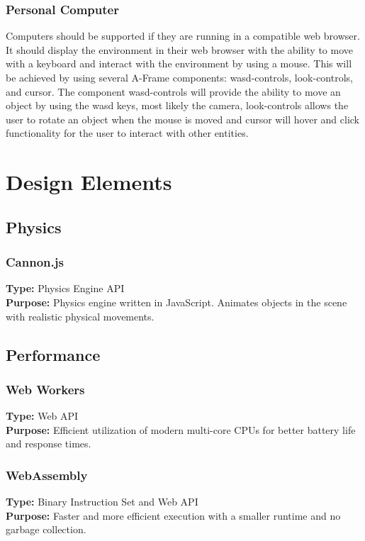 \documentclass[onecolumn, draftclsnofoot,10pt, compsoc]{IEEEtran}
\begin{document}
\subsubsection{Personal Computer}
Computers should be supported if they are running in a compatible web browser. It should display the environment in their web browser with the ability to move with a keyboard and interact with the environment by using a mouse. This will be achieved by using several A-Frame components: wasd-controls, look-controls, and cursor. The component wasd-controls will provide the ability to move an object by using the wasd keys, most likely the camera, look-controls allows the user to rotate an object when the mouse is moved and cursor will hover and click functionality for the user to interact with other entities.

\section{Design Elements}

\subsection{Physics}
\subsubsection{Cannon.js}
\textbf{Type:} Physics Engine API\\
\textbf{Purpose:} Physics engine written in JavaScript. Animates objects in the scene with realistic physical movements.

\subsection{Performance}
\subsubsection{Web Workers}
\textbf{Type:} Web API\\
\textbf{Purpose:} Efficient utilization of modern multi-core CPUs for better battery life and response times.

\subsubsection{WebAssembly}
\textbf{Type:} Binary Instruction Set and Web API\\
\textbf{Purpose:} Faster and more efficient execution with a smaller runtime and no garbage collection.
\end{document}
